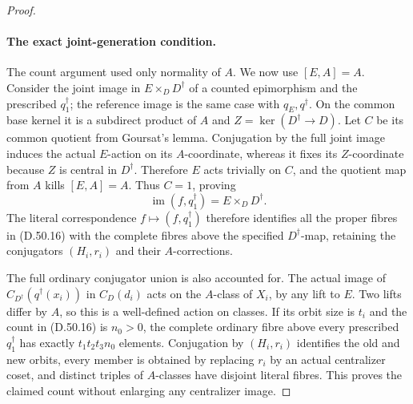 \begin{proof}
\paragraph{The exact joint-generation condition.}
The count argument used only normality of \(A\). We now use
\([E,A]=A\). Consider the joint image in
\(E\times_DD^\dagger\) of a counted epimorphism and the
prescribed \(q_1^\dagger\); the reference image is the same
case with \(q_E,q^\dagger\).
On the common base kernel it is a subdirect product of
\(A\) and \(Z=\ker(D^\dagger\to D)\).
Let \(C\) be its common quotient from Goursat's lemma.
Conjugation by the full joint image induces the actual
\(E\)-action on its \(A\)-coordinate, whereas it fixes its
\(Z\)-coordinate because \(Z\) is central in \(D^\dagger\).
Therefore \(E\) acts trivially on \(C\), and the quotient
map from \(A\) kills \([E,A]=A\). Thus \(C=1\), proving
\[
 \operatorname{im}(f,q_1^\dagger)
                        =E\times_DD^\dagger.
 \tag{D.50.17}
\]
The literal correspondence \(f\mapsto(f,q_1^\dagger)\)
therefore identifies all the proper fibres in
\textup{(D.50.16)} with the complete fibres above the
specified \(D^\dagger\)-map, retaining the conjugators
\((H_i,r_i)\) and their \(A\)-corrections.

The full ordinary conjugator union is also accounted for.
The actual image of
\(C_{D^\dagger}(q^\dagger(x_i))\) in \(C_D(d_i)\) acts
on the \(A\)-class of \(X_i\), by any lift to \(E\).
Two lifts differ by \(A\), so this is a well-defined
action on classes. If its orbit size is \(t_i\) and
the count in \textup{(D.50.16)} is \(n_0>0\), the complete
ordinary fibre above every prescribed \(q_1^\dagger\)
has exactly \(t_1t_2t_3n_0\) elements.
Conjugation by \((H_i,r_i)\) identifies the old and new
orbits, every member is obtained by replacing \(r_i\)
by an actual centralizer coset, and distinct triples of
\(A\)-classes have disjoint literal fibres. This proves
the claimed count without enlarging any centralizer image.


\end{proof}
